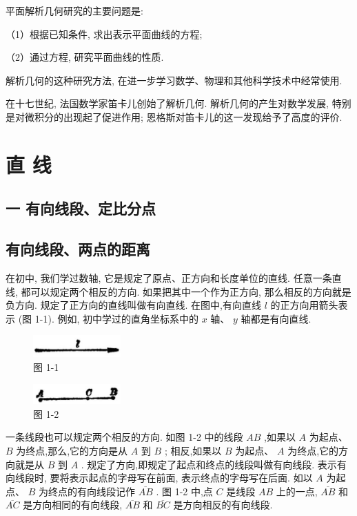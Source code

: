 \documentclass[lang=cn,newtx,10pt,scheme=chinese]{elegantbook}
\begin{document}
平面解析几何研究的主要问题是:

（1）根据已知条件, 求出表示平面曲线的方程;

（2）通过方程, 研究平面曲线的性质.

解析几何的这种研究方法, 在进一步学习数学、物理和其他科学技术中经常使用.

在十七世纪, 法国数学家笛卡儿创始了解析几何. 解析几何的产生对数学发展, 特别是对微积分的出现起了促进作用; 恩格斯对笛卡儿的这一发现给予了高度的评价.

\chapter{直 线}

\section*{一 有向线段、定比分点}

\section{有向线段、两点的距离}

在初中, 我们学过数轴, 它是规定了原点、正方向和长度单位的直线. 任意一条直线, 都可以规定两个相反的方向. 如果把其中一个作为正方向, 那么相反的方向就是负方向. 规定了正方向的直线叫做有向直线. 在图中,有向直线 \(l\) 的正方向用箭头表示 (图 1-1). 例如, 初中学过的直角坐标系中的 \(x\) 轴、 \(y\) 轴都是有向直线.

\begin{figure}[h]
  \centering
  \includegraphics[max width=0.3\textwidth]{images/01912cc2-ffb6-728e-9ae7-b113ff05c64b_7_968321.jpg}
  \caption{图 1-1}
\end{figure}



\begin{figure}[h]
  \centering
  \includegraphics[max width=0.3\textwidth]{images/01912cc2-ffb6-728e-9ae7-b113ff05c64b_7_264987.jpg}
  \caption{图 1-2}
\end{figure}



一条线段也可以规定两个相反的方向. 如图 1-2 中的线段 \({AB}\) ,如果以 \(A\) 为起点、 \(B\) 为终点,那么,它的方向是从 \(A\) 到 \(B\) ; 相反,如果以 \(B\) 为起点、 \(A\) 为终点,它的方向就是从 \(B\) 到 \(A\) . 规定了方向,即规定了起点和终点的线段叫做有向线段. 表示有向线段时, 要将表示起点的字母写在前面, 表示终点的字母写在后面. 如以 \(A\) 为起点、 \(B\) 为终点的有向线段记作 \(\overline{AB}\) . 图 1-2 中,点 \(C\) 是线段 \({AB}\) 上的一点, \(\overline{AB}\) 和 \(\overline{AC}\) 是方向相同的有向线段, \(\overline{AB}\) 和 \(\overline{BC}\) 是方向相反的有向线段.
\end{document}
